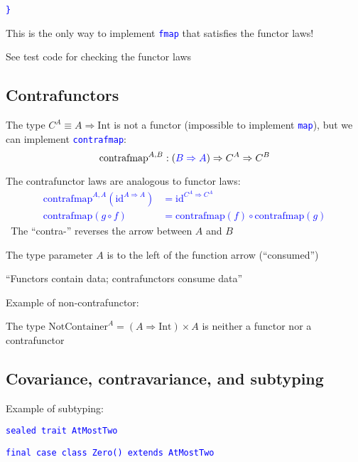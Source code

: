 \texttt{\textcolor{blue}{\footnotesize{}\}}}{\footnotesize\par}

This is the only way to implement \texttt{\textcolor{blue}{\footnotesize{}fmap}}
that satisfies the functor laws!

See test code for checking the functor laws


\subsection{Contrafunctors}

The type  $C^{A}\equiv A\Rightarrow\text{Int}$ is not a functor (impossible
to implement \texttt{\textcolor{blue}{\footnotesize{}map}}), but we
can implement \texttt{\textcolor{blue}{\footnotesize{}contrafmap}}:
\[
\text{contrafmap}^{A,B}:\left({\color{blue}B\Rightarrow A}\right)\Rightarrow C^{A}\Rightarrow C^{B}
\]

The contrafunctor laws are analogous to functor laws:\texttt{\textcolor{blue}{\footnotesize{}
\begin{align*}
\text{contrafmap}^{A,A}(\text{id}^{A\Rightarrow A}) & =\text{id}^{C^{A}\Rightarrow C^{A}}\\
\text{contrafmap}\left(g\circ f\right) & =\text{contrafmap}\left(f\right)\circ\text{contrafmap}\left(g\right)
\end{align*}
}}The ``contra-'' reverses the arrow between $A$ and $B$

The type parameter $A$ is to the left of the function arrow (``consumed'')

``Functors contain data; contrafunctors consume data''

Example of non-contrafunctor:

The type $\text{NotContainer}^{A}=\left(A\Rightarrow\text{Int}\right)\times A$
is neither a functor nor a contrafunctor


\subsection{Covariance, contravariance, and subtyping}

Example of subtyping:

\texttt{\textcolor{blue}{\footnotesize{}sealed trait AtMostTwo}}{\footnotesize\par}

\texttt{\textcolor{blue}{\footnotesize{}final case class Zero() extends
AtMostTwo}}{\footnotesize\par}

